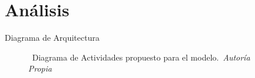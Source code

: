 \section{Análisis}

\begin{frame}{Diagrama de Arquitectura}%
    \vspace{-0.15cm}
    \begin{figure}[H]
        \centering
        \href{run:C:/Users/emicr/Documents/ESCOLARES/ESCOM/TRABAJO TERMINAL/Presentacion/img/Analisis/DiagramaProcesos/DiagramasAnalisis.drawio}{%
        }
        \vspace{-0.25cm}
        \caption{\tiny~Diagrama de Actividades propuesto para el modelo.~\textit{Autoría Propia}}%
        \label{fig:activities_diagram}
    \end{figure}
\end{frame}